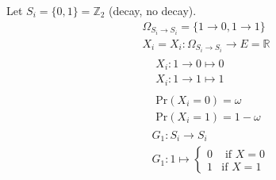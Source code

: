 \documentclass[10pt]{amsart}
\begin{document}
\begin{multicols*}{2}
Let $S_i = \lbrace 0 ,1 \rbrace = \mathbb{Z}_2$ (decay, no decay).
\[
\begin{gathered}
	\Omega_{S_i \to S_i } = \lbrace 1 \to 0 , 1 \to 1 \rbrace \\ 
	X_i = X_i : \Omega_{S_i \to S_i} \to E = \mathbb{R} \\
	\begin{aligned}
	& X_i : 1 \to 0 \mapsto 0 \\
	& X_i : 1 \to 1 \mapsto 1 
	\end{aligned} \\
	\begin{aligned}
	& \text{Pr}(X_i =0 ) = \omega \\ 
	& \text{Pr}(X_i = 1) = 1- \omega 
	\end{aligned}
\end{gathered}
\]
\[
\begin{aligned}
& G_1 : S_i \to S_i \\
& G_1 : 1 \mapsto \begin{cases} 0 & \text{ if } X = 0 \\
1 & \text{if } X = 1 \end{cases} 
\end{aligned}
\]


\end{multicols*}
\end{document}
